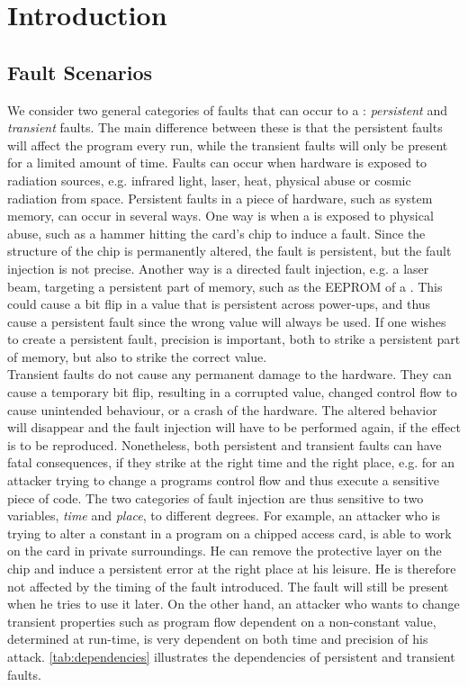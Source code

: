 \chapter{Introduction}
\section{Fault Scenarios}
We consider two general categories of faults that can occur to a \jc: \textit{persistent} and \textit{transient} faults. The main difference between these is that the persistent faults will affect the program every run, while the transient faults will only be present for a limited amount of time. Faults can occur when hardware is exposed to radiation sources, e.g. infrared light, laser, heat, physical abuse or cosmic radiation from space. 
Persistent faults in a piece of hardware, such as system memory, can occur in several ways. One way is when a \jc is exposed to physical abuse, such as a hammer hitting the card's chip to induce a fault. Since the structure of the chip is permanently altered, the fault is persistent, but the fault injection is not precise. Another way is a directed fault injection, e.g. a laser beam, targeting a persistent part of memory, such as the EEPROM of a \jc. This could cause a bit flip in a value that is persistent across power-ups, and thus cause a persistent fault since the wrong value will always be used. If one wishes to create a persistent fault, precision is important, both to strike a persistent part of memory, but also to strike the correct value.\\


Transient faults do not cause any permanent damage to the hardware. They can cause a temporary bit flip, resulting in a corrupted value, changed control flow to cause unintended behaviour, or a crash of the hardware. The altered behavior will disappear and the fault injection will have to be performed again, if the effect is to be reproduced.
Nonetheless, both persistent and transient faults can have fatal consequences, if they strike at the right time and the right place, e.g. for an attacker trying to change a programs control flow and thus execute a sensitive piece of code. The two categories of fault injection are thus sensitive to two variables, \textit{time} and \textit{place}, to different degrees. For example, an attacker who is trying to alter a constant in a program on a chipped access card, is able to work on the card in private surroundings. He can remove the protective layer on the chip and induce a persistent error at the right place at his leisure. He is therefore not affected by the timing of the fault introduced. The fault will still be present when he tries to use it later. On the other hand, an attacker who wants to change transient properties such as program flow dependent on a non-constant value, determined at run-time, is very dependent on both time and precision of his attack. \cref{tab:dependencies} illustrates the dependencies of persistent and transient faults.

